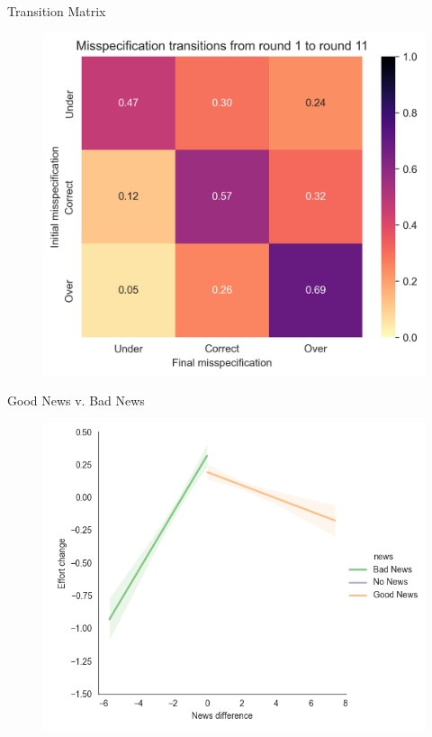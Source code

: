 \documentclass[aspectratio=169]{beamer}
\begin{document}
\begin{frame}{Transition Matrix}
    \begin{figure}
        \centering
        \includegraphics[scale=.6]{misspecification_transitions.png}
    \end{figure}

\end{frame}


\begin{frame}{Good News v. Bad News}
    \label{goodvbad}
    \begin{figure}
        \centering
        \includegraphics[scale=.5]{effort_change_news.png}
    \end{figure}

\end{frame}
\end{document}
